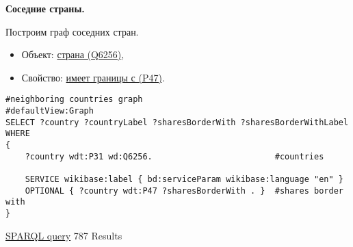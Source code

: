 \textbf{Соседние страны.}

Построим граф соседних стран.

\begin{itemize}
    \item Объект: \href{https://www.wikidata.org/wiki/Q6256}{страна (Q6256)},
    \item Свойство: \href{https://www.wikidata.org/wiki/Property:P47}{имеет границы с (P47)}.
\end{itemize}

\begin{lstlisting}[language=SPARQL]
#neighboring countries graph
#defaultView:Graph
SELECT ?country ?countryLabel ?sharesBorderWith ?sharesBorderWithLabel
WHERE
{
    ?country wdt:P31 wd:Q6256.                         #countries

    SERVICE wikibase:label { bd:serviceParam wikibase:language "en" }
    OPTIONAL { ?country wdt:P47 ?sharesBorderWith . }  #shares border with
}
\end{lstlisting}

\href{https://query.wikidata.org/#%23neighboring%20countries%20graph%0A%23defaultView%3AGraph%0ASELECT%20%3Fcountry%20%3FcountryLabel%20%3FsharesBorderWith%20%3FsharesBorderWithLabel%0AWHERE%0A%7B%0A%20%20%20%20%3Fcountry%20wdt%3AP31%20wd%3AQ6256.%0A%0A%20%20%20%20SERVICE%20wikibase%3Alabel%20%7B%20bd%3AserviceParam%20wikibase%3Alanguage%20%22en%22%20%7D%0A%20%20%20%20OPTIONAL%20%7B%20%3Fcountry%20wdt%3AP47%20%3FsharesBorderWith%20.%20%7D%0A%0A%7D%0A%0A}{SPARQL query} 787 Results